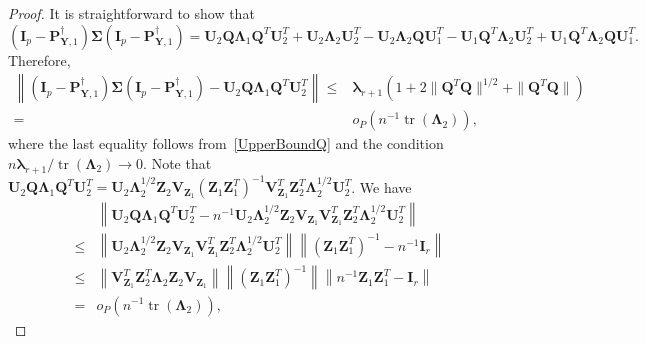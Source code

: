 \documentclass[12pt]{article} %
\DeclareMathOperator{\mytr}{tr}
\newcommand{\bQ}{\mathbf{Q}}
\newcommand{\bZ}{\mathbf{Z}}
\newcommand{\bP}{\mathbf{P}}
\newcommand{\bY}{\mathbf{Y}}
\newcommand{\bI}{\mathbf{I}}
\newcommand{\bU}{\mathbf{U}}
\newcommand{\bV}{\mathbf{V}}
\newcommand{\bfsym}[1]{\ensuremath{\boldsymbol{#1}}}
\def\blambda {\bfsym {\lambda}}
\def\bLambda {\bfsym {\Lambda}}
\def\bSigma {\bfsym {\Sigma}}
\theoremstyle{definition}
\begin{document}
\begin{appendices}
\begin{proof}
         It is straightforward to show that
         \begin{equation*}
         (\bI_p-\bP_{\bY,1}^{\dagger})
         \bSigma 
         (\bI_p-\bP_{\bY,1}^{\dagger})
             =
             \bU_2\bQ \bLambda_1 \bQ^T \bU_2^T 
             +\bU_2\bLambda_2  \bU_2^T
             -\bU_2 \bLambda_2 \bQ \bU_1^T
             -\bU_1 \bQ^T \bLambda_2 \bU_2^T
             +\bU_1 \bQ^T \bLambda_2 \bQ \bU_1^T.
         \end{equation*}
         Therefore,
         \begin{equation}\label{choc2}
             \begin{split}
         \left\|
         (\bI_p-\bP_{\bY,1}^{\dagger})
         \bSigma 
         (\bI_p-\bP_{\bY,1}^{\dagger})
             -
             \bU_2 \bQ \bLambda_1 \bQ^T  \bU_2^T
             \right\|
             \leq &
             \blambda_{r+1}(1+2\|\bQ^T \bQ\|^{1/2}+\|\bQ^T \bQ\|)
             \\
             = &
             o_P\left(n^{-1}\mytr(\bLambda_2)\right)
             ,
             \end{split}
         \end{equation}
         where the last equality follows from~\eqref{UpperBoundQ} and the condition $n\blambda_{r+1}/\mytr(\bLambda_2)\to 0$.
         Note that
         $
             \bU_2\bQ \bLambda_1 \bQ^T\bU_2^T
             =
             \bU_2 \bLambda_2^{1/2} \bZ_2 \bV_{\bZ_1} (\bZ_1 \bZ_1^T)^{-1}\bV_{\bZ_1}^T \bZ_2^T \bLambda_2^{1/2} \bU_2^T$. 
             We have
     \begin{equation} \label{choc6}
     \begin{split}
             &\left\|\bU_2\bQ \bLambda_1 \bQ^T\bU_2^T
             -
             n^{-1} \bU_2 \bLambda_2^{1/2} \bZ_2 \bV_{\bZ_1} \bV_{\bZ_1}^T \bZ_2^T \bLambda_2^{1/2} \bU_2^T
             \right\|
             \\
             \leq&
             \left\|\bU_2 \bLambda_2^{1/2} \bZ_2 \bV_{\bZ_1}\bV_{\bZ_1}^T \bZ_2^T \bLambda_2^{1/2} \bU_2^T\right\|
             \left\|(\bZ_1 \bZ_1^T)^{-1} - n^{-1} \bI_r\right\|
                  \\
            \leq&
             \left\|\bV_{\bZ_1}^T \bZ_2^T \bLambda_2 \bZ_2 \bV_{\bZ_1}\right\|
                  \left\|(\bZ_1 \bZ_1^T)^{-1}\right\|
                  \left\|n^{-1}\bZ_1 \bZ_1^T -\bI_r\right\|
                  \\
                  =&
                  o_P\left(n^{-1}\mytr(\bLambda_2)\right),
     \end{split}

\end{equation}
\end{proof}
\end{appendices}
\end{document}
